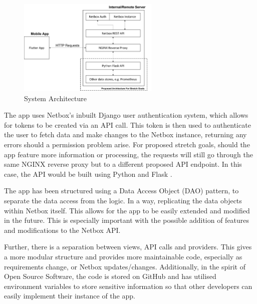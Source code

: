 \documentclass [11pt,a4paper]{article}
\begin{document}
\begin{figure}[H]
    \centering
    \includegraphics[width=0.6\textwidth]{images/top-level-archi.png}
    \caption{System Architecture}
    \label{fig:architecture}
\end{figure}

The app uses Netbox's inbuilt Django user authentication system, which allows for tokens to be created via an API call. This token is then used to authenticate the user to fetch data and make changes to the Netbox instance, returning any errors should a permission problem arise. For proposed stretch goals, should the app feature more information or processing, the requests will still go through the same NGINX reverse proxy but to a different proposed API endpoint. In this case, the API would be built using Python and Flask \cite{flask}. 

The app has been structured using a Data Access Object (DAO) pattern\cite{dao}, to separate the data access from the logic. In a way, replicating the data objects within Netbox itself. This allows for the app to be easily extended and modified in the future. This is especially important with the possible addition of features and modifications to the Netbox API.

Further, there is a separation between views, API calls and providers. This gives a more modular structure and provides more maintainable code, especially as requirements change, or Netbox updates/changes. Additionally, in the spirit of Open Source Software, the code is stored on GitHub \cite{keeptrackgithub} and has utilised environment variables to store sensitive information so that other developers can easily implement their instance of the app.
\end{document}
